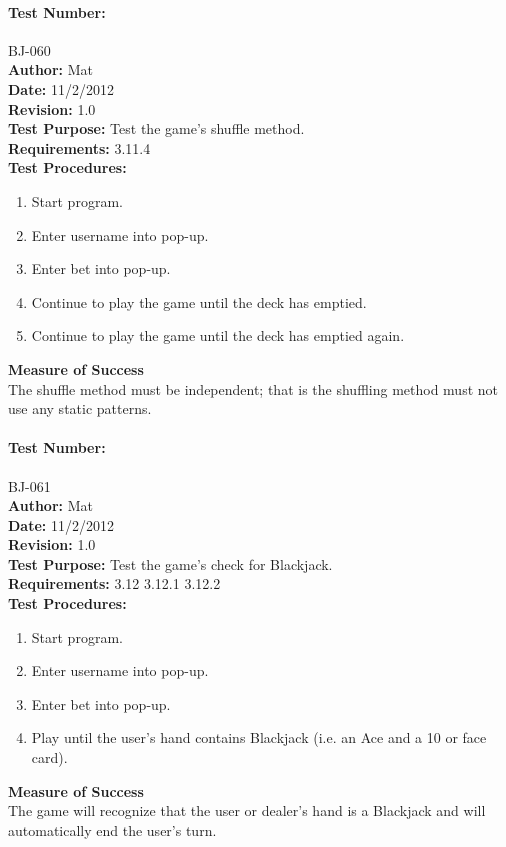 \documentclass{article}
\begin{document}
\paragraph{Test Number:} BJ-060\\
\textbf{Author:} Mat\\
\textbf{Date:} 11/2/2012\\
\textbf{Revision:} 1.0\\
\textbf{Test Purpose:} Test the game's shuffle method.\\
\textbf{Requirements:} 3.11.4 \\
\textbf{Test Procedures:} 
\begin{enumerate}
\item Start program.
\item Enter username into pop-up.
\item Enter bet into pop-up.
\item Continue to play the game until the deck has emptied.
\item Continue to play the game until the deck has emptied again.
\end{enumerate}
\textbf{Measure of Success}\\The shuffle method must be independent; that is the shuffling method must not use any static patterns.
\paragraph{Test Number:} BJ-061\\
\textbf{Author:} Mat\\
\textbf{Date:} 11/2/2012\\
\textbf{Revision:} 1.0\\
\textbf{Test Purpose:} Test the game's check for Blackjack.\\
\textbf{Requirements:} 3.12 3.12.1 3.12.2 \\
\textbf{Test Procedures:} 
\begin{enumerate}
\item Start program.
\item Enter username into pop-up.
\item Enter bet into pop-up.
\item Play until the user's hand contains Blackjack (i.e. an Ace and a 10 or face card).
\end{enumerate}
\textbf{Measure of Success}\\The game will recognize that the user or dealer's hand is a Blackjack and will automatically end the user's turn.
\end{document}
